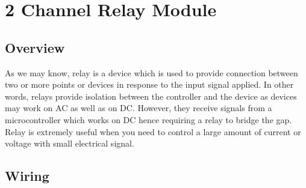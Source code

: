 \documentclass[a4paper,11pt,english]{sphinxmanual}
\begin{document}
\begin{sphinxVerbatim}[commandchars=\\\{\}]
\end{sphinxVerbatim}

\sphinxstepscope


\section{2 Channel Relay Module}
\label{\detokenize{Basic_Project/2_Channel_Relay_Module:channel-relay-module}}\label{\detokenize{Basic_Project/2_Channel_Relay_Module:basic-2-channel-relay-module}}\label{\detokenize{Basic_Project/2_Channel_Relay_Module::doc}}

\subsection{Overview}
\label{\detokenize{Basic_Project/2_Channel_Relay_Module:overview}}
\sphinxAtStartPar
As we may know, relay is a device which is used to provide connection between two or more points or devices in response to the input signal applied. In other words, relays provide isolation between the controller and the device as devices may work on AC as well as on DC. However, they receive signals from a micro\sphinxhyphen{}controller which works on DC hence requiring a relay to bridge the gap. Relay is extremely useful when you need to control a large amount of current or voltage with small electrical signal.


\subsection{Wiring}
\label{\detokenize{Basic_Project/2_Channel_Relay_Module:wiring}}
\end{document}
